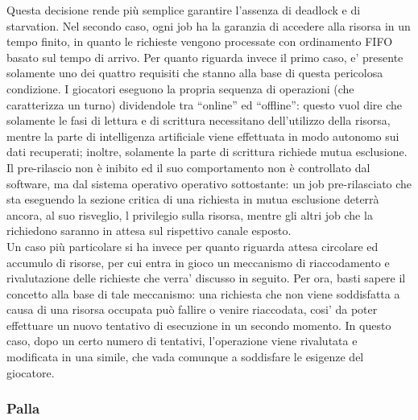 Questa decisione rende più semplice garantire l'assenza di deadlock e di starvation. Nel secondo caso, ogni job ha la garanzia di accedere alla risorsa in un tempo finito, in quanto le richieste vengono processate con ordinamento FIFO basato sul tempo di arrivo. Per quanto riguarda invece il primo caso, e' presente solamente uno dei quattro requisiti che stanno alla base di questa pericolosa condizione. I giocatori eseguono la propria sequenza di operazioni (che caratterizza un turno) dividendole tra ``online'' ed ``offline'': questo vuol dire che solamente le fasi di lettura e di scrittura necessitano dell'utilizzo della risorsa, mentre la parte di intelligenza artificiale viene effettuata in modo autonomo sui dati recuperati; inoltre, solamente la parte di scrittura richiede mutua esclusione. Il pre-rilascio non è inibito ed il suo comportamento non è controllato dal software, ma dal sistema operativo operativo sottostante: un job pre-rilasciato che sta eseguendo la sezione critica di una richiesta in mutua esclusione deterrà ancora, al suo risveglio, l privilegio sulla risorsa, mentre gli altri job che la richiedono saranno in attesa sul rispettivo canale esposto.\\

Un caso più particolare si ha invece per quanto riguarda attesa circolare ed accumulo di risorse, per cui entra in gioco un meccanismo di riaccodamento e rivalutazione delle richieste che verra' discusso in seguito. Per ora, basti sapere il concetto alla base di tale meccanismo: una richiesta che non viene soddisfatta a causa di una risorsa occupata può fallire o venire riaccodata, cosi' da poter effettuare un nuovo tentativo di esecuzione in un secondo momento. In questo caso, dopo un certo numero di tentativi, l'operazione viene rivalutata e modificata in una simile, che vada comunque a soddisfare le esigenze del giocatore.

\subsubsection{Palla}
\label{sec:analisi_concorrenza_palla}

